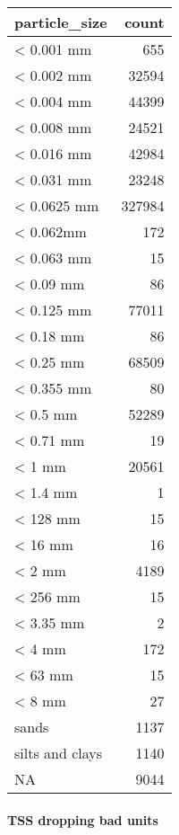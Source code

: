 \documentclass[]{article}
\newenvironment{Shaded}{\begin{snugshade}}{\end{snugshade}}
\newcommand{\CommentTok}[1]{\textcolor[rgb]{0.56,0.35,0.01}{\textit{#1}}}
\newcommand{\DataTypeTok}[1]{\textcolor[rgb]{0.13,0.29,0.53}{#1}}
\newcommand{\KeywordTok}[1]{\textcolor[rgb]{0.13,0.29,0.53}{\textbf{#1}}}
\newcommand{\NormalTok}[1]{#1}
\newcommand{\OperatorTok}[1]{\textcolor[rgb]{0.81,0.36,0.00}{\textbf{#1}}}
\newcommand{\OtherTok}[1]{\textcolor[rgb]{0.56,0.35,0.01}{#1}}
\newcommand{\StringTok}[1]{\textcolor[rgb]{0.31,0.60,0.02}{#1}}
\let\oldparagraph\paragraph
\renewcommand{\paragraph}[1]{\oldparagraph{#1}\mbox{}}
\begin{document}
\begin{longtable}[]{@{}lr@{}}
\toprule
particle\_size & count\tabularnewline
\midrule
\endhead
\textless{} 0.001 mm & 655\tabularnewline
\textless{} 0.002 mm & 32594\tabularnewline
\textless{} 0.004 mm & 44399\tabularnewline
\textless{} 0.008 mm & 24521\tabularnewline
\textless{} 0.016 mm & 42984\tabularnewline
\textless{} 0.031 mm & 23248\tabularnewline
\textless{} 0.0625 mm & 327984\tabularnewline
\textless{} 0.062mm & 172\tabularnewline
\textless{} 0.063 mm & 15\tabularnewline
\textless{} 0.09 mm & 86\tabularnewline
\textless{} 0.125 mm & 77011\tabularnewline
\textless{} 0.18 mm & 86\tabularnewline
\textless{} 0.25 mm & 68509\tabularnewline
\textless{} 0.355 mm & 80\tabularnewline
\textless{} 0.5 mm & 52289\tabularnewline
\textless{} 0.71 mm & 19\tabularnewline
\textless{} 1 mm & 20561\tabularnewline
\textless{} 1.4 mm & 1\tabularnewline
\textless{} 128 mm & 15\tabularnewline
\textless{} 16 mm & 16\tabularnewline
\textless{} 2 mm & 4189\tabularnewline
\textless{} 256 mm & 15\tabularnewline
\textless{} 3.35 mm & 2\tabularnewline
\textless{} 4 mm & 172\tabularnewline
\textless{} 63 mm & 15\tabularnewline
\textless{} 8 mm & 27\tabularnewline
sands & 1137\tabularnewline
silts and clays & 1140\tabularnewline
NA & 9044\tabularnewline
\bottomrule
\end{longtable}

\begin{Shaded}
\end{Shaded}

\hypertarget{tss-dropping-bad-units}{%
\paragraph{TSS dropping bad units}\label{tss-dropping-bad-units}}
\end{document}
